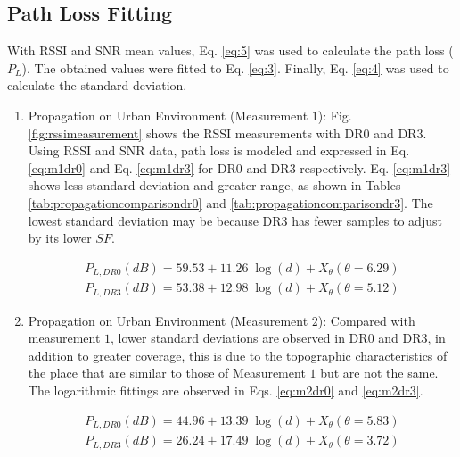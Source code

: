 \subsection{Path Loss Fitting}
\label{sub:fitting}

With RSSI and SNR mean values, Eq. \eqref{eq:5} was used to calculate the path loss ($P_L$). The obtained values were fitted to Eq. \eqref{eq:3}. Finally, Eq. \eqref{eq:4} was used to calculate the standard deviation.

\begin{enumerate}

\item Propagation on Urban Environment (Measurement $1$): Fig. \ref{fig:rssimeasurement} shows the RSSI measurements with DR$0$ and DR$3$. Using RSSI and SNR data, path loss is modeled and expressed in Eq. \eqref{eq:m1dr0} and Eq. \eqref{eq:m1dr3} for DR$0$ and DR$3$ respectively. Eq. \eqref{eq:m1dr3} shows less standard deviation and greater range, as shown in Tables \ref{tab:propagationcomparisondr0} and \ref{tab:propagationcomparisondr3}. The lowest standard deviation may be because DR$3$ has fewer samples to adjust by its lower $SF$.

\begin{eqnarray} 
P_{L,DR0}(dB) = 59.53+11.26\;\log(d)+X_\theta(\theta=6.29) \label{eq:m1dr0}\\
P_{L,DR3}(dB) = 53.38+12.98\;\log(d)+X_\theta(\theta=5.12) \label{eq:m1dr3}
\end{eqnarray}

\item Propagation on Urban Environment (Measurement $2$): Compared with measurement $1$, lower standard deviations are observed in DR$0$ and DR$3$, in addition to greater coverage, this is due to the topographic characteristics of the place that are similar to those of Measurement $1$ but are not the same. The logarithmic fittings are observed in Eqs. \eqref{eq:m2dr0} and \eqref{eq:m2dr3}.

\begin{eqnarray} 
P_{L,DR0}(dB) = 44.96+13.39\;\log(d)+X_\theta(\theta=5.83) \label{eq:m2dr0} \\
P_{L,DR3}(dB) = 26.24+17.49\;\log(d)+X_\theta(\theta=3.72)  \label{eq:m2dr3}
\end{eqnarray}


\end{enumerate}
